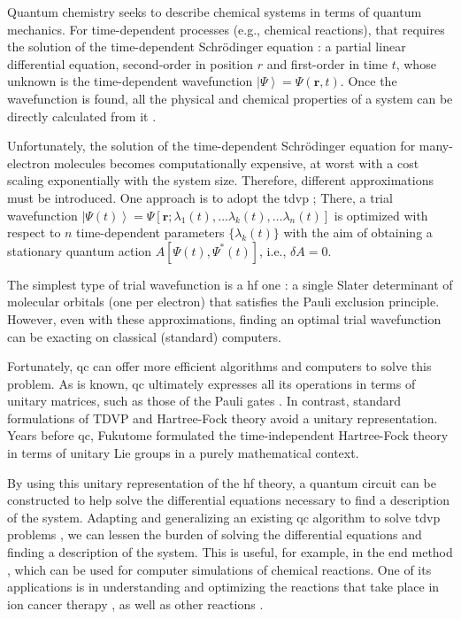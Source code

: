 \documentclass{aux/ttuthes2007}
\newcommand{\ket}[1]{\ensuremath{\left|#1\right\rangle}}
\begin{document}
Quantum chemistry  seeks to describe chemical systems in terms of quantum mechanics.
For time-dependent processes (e.g., chemical reactions), that requires the solution of the time-dependent Schrödinger equation : a partial linear differential equation, second-order in position $r$ and first-order in time $t$, whose unknown is the time-dependent wavefunction $\ket \Psi = \Psi(\bm r, t)$.
Once the wavefunction is found, all the physical and chemical properties of a system can be directly calculated from it .

Unfortunately, the solution of the time-dependent Schrödinger equation for many-electron molecules becomes computationally expensive, at worst with a cost scaling exponentially with the system size.
Therefore, different approximations must be introduced.
One approach is to adopt the \gls{tdvp} ;
There, a trial wavefunction $\ket {\Psi(t)} = \Psi\left[\bm r; \lambda_1(t), \ldots \lambda_k(t), \ldots \lambda_n(t) \right ]$ is optimized with respect to $n$ time-dependent parameters $\{\lambda_k(t)\}$ with the aim of obtaining a stationary quantum action $A \left[ \Psi(t), \Psi^*(t) \right ] $, i.e., $\delta A = 0$.

The simplest type of trial wavefunction is a \gls{hf} one :
a single Slater determinant of molecular orbitals (one per electron) that satisfies the Pauli exclusion principle.
However, even with these approximations, finding an optimal trial wavefunction can be exacting on classical (standard) computers.

Fortunately, \gls{qc}  can offer more efficient algorithms and computers to solve this problem.
As is known, \gls{qc} ultimately expresses all its operations in terms of unitary matrices, such as those of the Pauli gates .
In contrast, standard formulations of TDVP and Hartree-Fock theory  avoid a unitary representation.
Years before \gls{qc}, Fukutome  formulated the time-independent Hartree-Fock theory in terms of unitary Lie groups  in a purely mathematical context.

By using this unitary representation of the \gls{hf} theory, a quantum circuit can be constructed to help solve the differential equations necessary to find a description of the system. 
Adapting and generalizing an existing \gls{qc} algorithm to solve \gls{tdvp} problems , we can lessen the burden of solving the differential equations and finding a description of the system. This is useful, for example, in the \gls{end} method , which can be used for computer simulations of chemical reactions. One of its applications is in understanding and optimizing the reactions that take place in ion cancer therapy , as well as other reactions .
\end{document}

